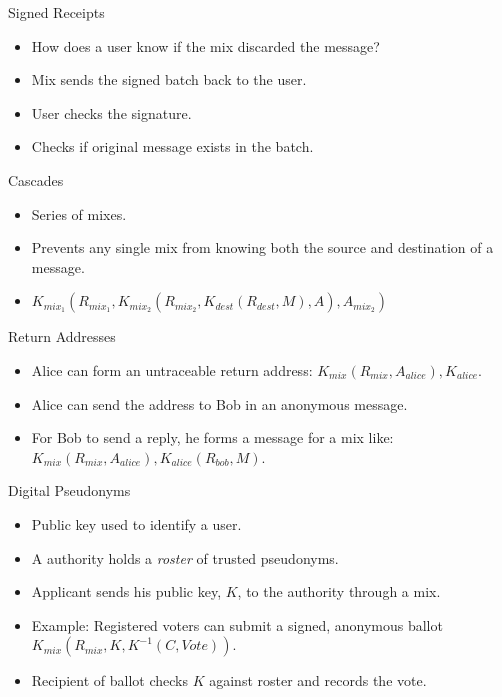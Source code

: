 \documentclass[default,pdf,colorBG,slideColor]{prosper}
\begin{document}
\begin{slide}{Signed Receipts}
\begin{itemize}
\item How does a user know if the mix discarded the message?
\item Mix sends the signed batch back to the user.
\item User checks the signature.
\item Checks if original message exists in the batch.
\end{itemize}
\end{slide}

\begin{slide}{Cascades}
\begin{itemize}
\item Series of mixes.
\item Prevents any single mix from knowing both the source and destination of a message.
\item $K_{mix_1}(R_{mix_1}, K_{mix_2}(R_{mix_2}, K_{dest}(R_{dest}, M), A), A_{mix_2})$
\end{itemize}
\end{slide}

\begin{slide}{Return Addresses}
\begin{itemize}
\item Alice can form an untraceable return address: $K_{mix}(R_{mix}, A_{alice}), K_{alice}$.
\item Alice can send the address to Bob in an anonymous message.
\item For Bob to send a reply, he forms a message for a mix like: $K_{mix}(R_{mix}, A_{alice}), K_{alice}(R_{bob}, M)$.
\end{itemize}
\end{slide}

\begin{slide}{Digital Pseudonyms}
\begin{itemize}
\item Public key used to identify a user.
\item A authority holds a \emph{roster} of trusted pseudonyms.
\item Applicant sends his public key, $K$, to the authority through a mix.
\item Example: Registered voters can submit a signed, anonymous ballot $K_{mix}(R_{mix}, K, K^{-1}(C, Vote))$.
\item Recipient of ballot checks $K$ against roster and records the vote.
\end{itemize}
\end{slide}
\end{document}
